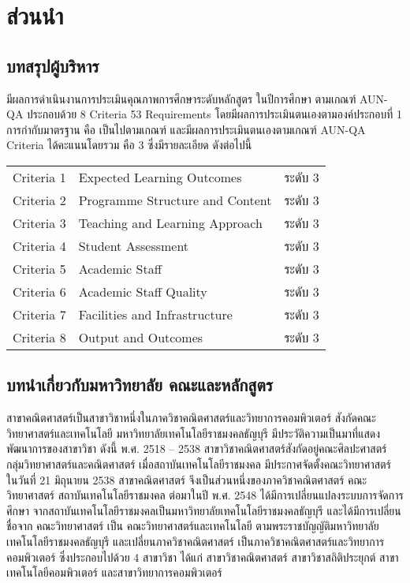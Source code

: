\chapter{ส่วนนำ}

\section{บทสรุปผู้บริหาร}

\printprogram{} \printfaculty{} \printuniversity{} มีผลการดำเนินงานการประเมินคุณภาพการศึกษาระดับหลักสูตร ในปีการศึกษา \printyear{} ตามเกณฑ์ AUN-QA ประกอบด้วย 8 Criteria 53 Requirements โดยมีผลการประเมินตนเองตามองค์ประกอบที่ 1 การกำกับมาตรฐาน คือ เป็นไปตามเกณฑ์ และมีผลการประเมินตนเองตามเกณฑ์ AUN-QA Criteria ได้คะแนนโดยรวม คือ 3 ซึ่งมีรายละเอียด ดังต่อไปนี้

\begin{center}
\begin{tabular}{clc}
Criteria 1 & Expected Learning Outcomes &	ระดับ 3 \\ 
Criteria 2 & Programme Structure and Content &	ระดับ 3 \\
Criteria 3 & Teaching and Learning Approach &	ระดับ 3 \\
Criteria 4 & Student Assessment &	ระดับ 3 \\
Criteria 5 & Academic Staff &	ระดับ 3 \\
Criteria 6 & Academic Staff Quality &	ระดับ 3 \\
Criteria 7 & Facilities and Infrastructure &	ระดับ 3 \\
Criteria 8 & Output and Outcomes &	ระดับ 3 
\end{tabular}    
\end{center}

\section{บทนำเกี่ยวกับมหาวิทยาลัย คณะและหลักสูตร}

สาขาคณิตศาสตร์เป็นสาขาวิชาหนึ่งในภาควิชาคณิตศาสตร์และวิทยาการคอมพิวเตอร์  สังกัดคณะวิทยาศาสตร์และเทคโนโลยี มหาวิทยาลัยเทคโนโลยีราชมงคลธัญบุรี มีประวัติความเป็นมาที่แสดงพัฒนาการของสาขาวิชา ดังนี้ พ.ศ. 2518 – 2538  สาขาวิชาคณิตศาสตร์สังกัดอยู่คณะศิลปะศาสตร์ กลุ่มวิทยาศาสตร์และคณิตศาสตร์ เมื่อสถาบันเทคโนโลยีราชมงคล มีประกาศจัดตั้งคณะวิทยาศาสตร์ ในวันที่ 21 มิถุนายน 2538 สาขาคณิตศาสตร์ จึงเป็นส่วนหนึ่งของภาควิชาคณิตศาสตร์ คณะวิทยาศาสตร์ สถาบันเทคโนโลยีราชมงคล ต่อมาในปี พ.ศ. 2548 ได้มีการเปลี่ยนแปลงระบบการจัดการศึกษา จากสถาบันเทคโนโลยีราชมงคลเป็นมหาวิทยาลัยเทคโนโลยีราชมงคลธัญบุรี และได้มีการเปลี่ยนชื่อจาก คณะวิทยาศาสตร์ เป็น คณะวิทยาศาสตร์และเทคโนโลยี ตามพระราชบัญญัติมหาวิทยาลัยเทคโนโลยีราชมงคลธัญบุรี  และเปลี่ยนภาควิชาคณิตศาสตร์ เป็นภาควิชาคณิตศาสตร์และวิทยาการคอมพิวเตอร์  ซึ่งประกอบไปด้วย 4 สาขาวิชา ได้แก่ สาขาวิชาคณิตศาสตร์ สาขาวิชาสถิติประยุกต์  สาขาเทคโนโลยีคอมพิวเตอร์  และสาขาวิทยาการคอมพิวเตอร์

